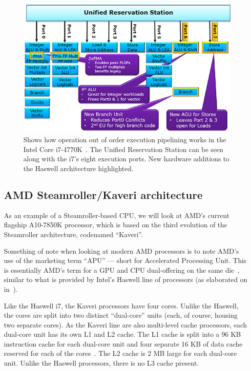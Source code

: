 \documentclass[a4paper,11pt]{article}
\begin{document}
\begin{figure}[h]
  \centering
  \includegraphics[scale=0.5]{img/new-ports}
  \caption{Shows how operation out of order execution pipelining works in the Intel Core i7-4770K~\cite{web:TomsHWCorei7}. The Unified Reservation Station can be seen along with the i7's eight execution ports. New hardware additions to the Haswell architecture highlighted.}
\label{fig:haswell-new-ports}
\end{figure}

\subsection{AMD Steamroller/Kaveri architecture} %
\label{sub:amd_steamroller_architecture}
As an example of a Steamroller-based CPU, we will look at AMD's current flagship A10-7850K processor, which is based on the third evolution of the Steamroller architecture, codenamed ``Kaveri''.

Something of note when looking at modern AMD processors is to note AMD's use of the marketing term ``APU'' --- short for Accelerated Processing Unit. This is essentially AMD's term for a GPU and CPU dual-offering on the same die~\cite{web:AMDAPU}, similar to what is provided by Intel's Haswell line of processors (as elaborated on in~).

Like the Haswell i7, the Kaveri processors have four cores. Unlike the Haswell, the cores are split into two distinct ``dual-core'' units (each, of course, housing two separate cores). As the Kaveri line are also multi-level cache processors, each dual-core unit has its own L1 and L2 cache. The L1 cache is split into a 96 KB instruction cache for each dual-core unit and four separate 16 KB of data cache reserved for each of the cores~\cite{web:Guru3dKaveri}. The L2 cache is 2 MB large for each dual-core unit. Unlike the Haswell processors, there is no L3 cache present.
\end{document}

